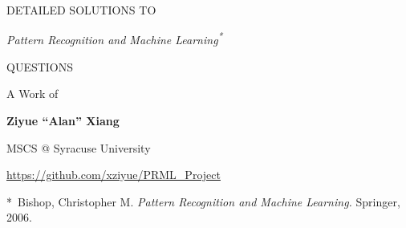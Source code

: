 \begin{titlepage}
	\vspace*{6cm}
	{\Huge \bfseries \scshape
	\begin{center}
		DETAILED SOLUTIONS TO
		
		{\itshape \huge Pattern Recognition and Machine Learning\textsuperscript{*}}
		
		QUESTIONS
	\end{center}
	}
	
	\vspace*{4cm}
	
	{\Large
	\begin{center}
		A Work of
		
		\vspace*{1em}
		{\bfseries Ziyue ``Alan'' Xiang}
		
		
		MSCS @ Syracuse University
		
		\vspace*{1.5cm}
		\url{https://github.com/xziyue/PRML_Project}
	\end{center}
	}

\vfill
{\footnotesize
	*~Bishop, Christopher M. \textit{Pattern Recognition and Machine Learning.} Springer, 2006.
}
	
\end{titlepage}
